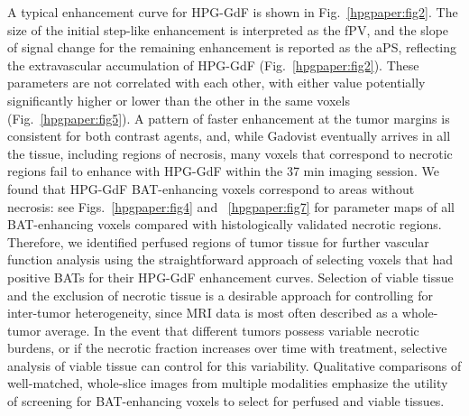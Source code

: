 A typical enhancement curve for HPG-GdF is shown in Fig.~\ref{hpgpaper:fig2}.
The size of the initial step-like enhancement is interpreted as the fPV, and the slope of signal change for the remaining enhancement is reported as the aPS, reflecting the extravascular accumulation of HPG-GdF (Fig.~\ref{hpgpaper:fig2}).
These parameters are not correlated with each other, with either value potentially significantly higher or lower than the other in the same voxels (Fig.~\ref{hpgpaper:fig5}).
A pattern of faster enhancement at the tumor margins is consistent for both contrast agents, and, while Gadovist eventually arrives in all the tissue, including regions of necrosis, many voxels that correspond to necrotic regions fail to enhance with HPG-GdF within the 37 min imaging session.
We found that HPG-GdF BAT-enhancing voxels correspond to areas without necrosis: see Figs.~\ref{hpgpaper:fig4} and ~\ref{hpgpaper:fig7} for parameter maps of all BAT-enhancing voxels compared with histologically validated necrotic regions.
Therefore, we identified perfused regions of tumor tissue for further vascular function analysis using the straightforward approach of selecting voxels that had positive BATs for their HPG-GdF enhancement curves.
Selection of viable tissue and the exclusion of necrotic tissue is a desirable approach for controlling for inter-tumor heterogeneity, since MRI data is most often described as a whole-tumor average.
In the event that different tumors possess variable necrotic burdens, or if the necrotic fraction increases over time with treatment, selective analysis of viable tissue can control for this variability.
Qualitative comparisons of well-matched, whole-slice images from multiple modalities emphasize the utility of screening for BAT-enhancing voxels to select for perfused and viable tissues.

